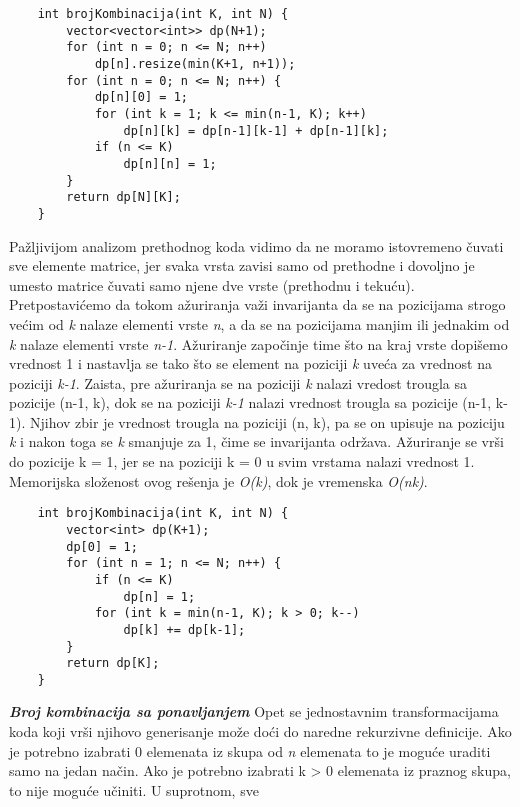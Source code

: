 \documentclass{article}
\begin{document}
\begin{lstlisting}
    int brojKombinacija(int K, int N) {
        vector<vector<int>> dp(N+1);
        for (int n = 0; n <= N; n++)
            dp[n].resize(min(K+1, n+1));
        for (int n = 0; n <= N; n++) {
            dp[n][0] = 1;
            for (int k = 1; k <= min(n-1, K); k++)
                dp[n][k] = dp[n-1][k-1] + dp[n-1][k];
            if (n <= K)
                dp[n][n] = 1;
        }
        return dp[N][K];
    }
\end{lstlisting}
Pažljivijom analizom prethodnog koda vidimo da ne moramo istovremeno čuvati sve elemente matrice,
jer svaka vrsta zavisi samo od prethodne i dovoljno je umesto matrice čuvati
samo njene dve vrste (prethodnu i tekuću). Pretpostavićemo
da tokom ažuriranja važi invarijanta da se na pozicijama strogo većim od \textit{k}
nalaze elementi vrste \textit{n}, a da se na pozicijama manjim ili jednakim od \textit{k} nalaze
elementi vrste \textit{n-1}. Ažuriranje započinje time što na kraj vrste dopišemo
vrednost 1 i nastavlja
se tako što se element na poziciji \textit{k} uveća za vrednost na poziciji \textit{k-1}. Zaista,
pre ažuriranja se na poziciji \textit{k} nalazi vredost trougla sa pozicije (n-1, k), dok
se na poziciji \textit{k-1} nalazi vrednost trougla sa pozicije (n-1, k-1). Njihov zbir
je vrednost trougla na poziciji (n, k), pa se on upisuje na poziciju \textit{k} i nakon toga
se \textit{k} smanjuje za 1, čime se invarijanta održava. Ažuriranje se vrši do pozicije
k = 1, jer se na poziciji k = 0 u svim vrstama nalazi vrednost 1. Memorijska složenost ovog rešenja je \textit{O(k)}, dok je vremenska \textit{O(nk)}.
\begin{lstlisting}
    int brojKombinacija(int K, int N) {
        vector<int> dp(K+1);
        dp[0] = 1;
        for (int n = 1; n <= N; n++) {
            if (n <= K) 
                dp[n] = 1;
            for (int k = min(n-1, K); k > 0; k--)
                dp[k] += dp[k-1];
        }
        return dp[K];
    }
\end{lstlisting}
\vspace{0.3cm}
\textit{\textbf{Broj kombinacija sa ponavljanjem}}
\vspace{0.2cm}\newline
Opet
se jednostavnim transformacijama koda koji vrši njihovo generisanje može doći
do naredne rekurzivne definicije. Ako je potrebno izabrati 0 elemenata iz skupa od \textit{n}
elemenata to je moguće uraditi samo na jedan način. Ako je potrebno izabrati
k > 0 elemenata iz praznog skupa, to nije moguće učiniti. U suprotnom, sve
\end{document}
